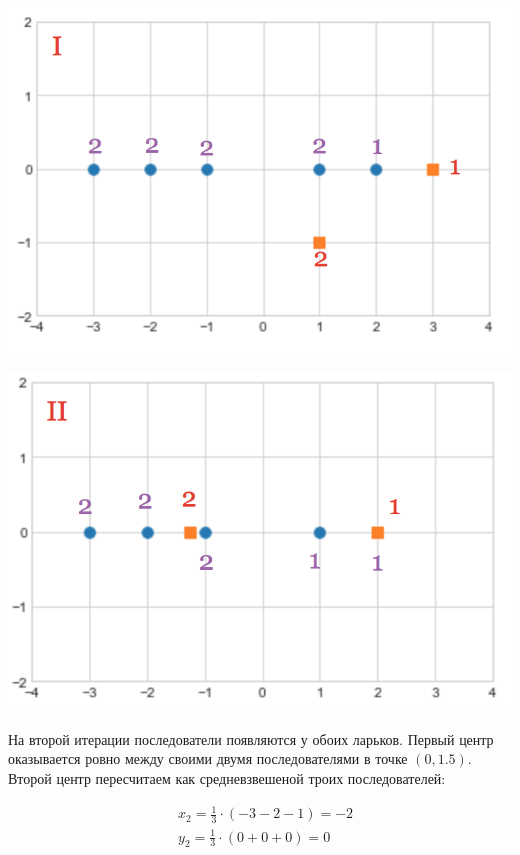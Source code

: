 \documentclass[12pt, a4paper, oneside]{article}
\begin{document}
{\begin{enumerate}
	\begin{minipage}[t]{0.45\textwidth}
		\includegraphics[scale=0.25]{k_means_a1.png}
	\end{minipage}
	\hfill
	\begin{minipage}[t]{0.45\textwidth}
		\includegraphics[scale=0.25]{k_means_a2.png}
	\end{minipage}

На второй итерации последователи появляются у обоих ларьков. Первый центр оказывается ровно между своими двумя последователями в точке $(0,1.5)$. Второй центр пересчитаем как средневзвешеной троих последователей: 

\begin{equation}
\begin{aligned}
& x_2 = \frac{1}{3} \cdot (-3 -2 -1 ) = - 2 \\ 
& y_2 = \frac{1}{3} \cdot (0 + 0 + 0 ) = 0 \\ 
\end{aligned}
\end{equation}



\end{enumerate}}
\end{document}
